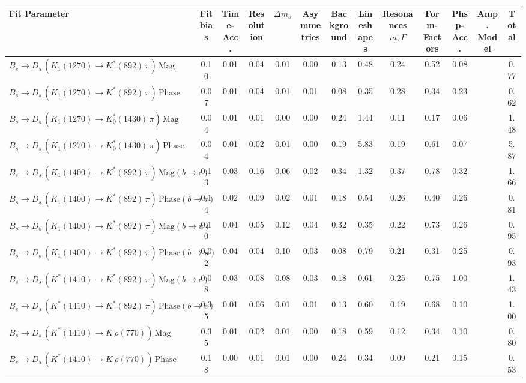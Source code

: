 \begin{tabular}{l  c  c  c  c  c  c  c  c  c  c  c  | c }
\hline
\hline
Fit Parameter & Fit bias & Time-Acc. & Resolution & $\Delta m_{s}$ & Asymmetries & Background & Lineshapes & Resonances $m,\Gamma$ & Form-Factors & Phsp-Acc. & Amp. Model &  Total  \\ 
\hline
$B_s \to D_s \, ( K_1(1270) \to K^{*}(892) \, \pi ) \, \text{Mag}$ & 0.10 & 0.01 & 0.04 & 0.01 & 0.00 & 0.13 & 0.48 & 0.24 & 0.52 & 0.08 &  & 0.77 \\ 
$B_s \to D_s \, ( K_1(1270) \to K^{*}(892) \, \pi ) \, \text{Phase}$ & 0.07 & 0.01 & 0.04 & 0.01 & 0.01 & 0.08 & 0.35 & 0.28 & 0.34 & 0.23 &  & 0.62 \\ 
$B_s \to D_s \, ( K_1(1270) \to K^{*}_{0}(1430) \, \pi ) \, \text{Mag} $ & 0.04 & 0.01 & 0.01 & 0.00 & 0.00 & 0.24 & 1.44 & 0.11 & 0.17 & 0.06 &  & 1.48 \\ 
$B_s \to D_s \, ( K_1(1270) \to K^{*}_{0}(1430) \, \pi ) \, \text{Phase} $ & 0.04 & 0.01 & 0.02 & 0.01 & 0.00 & 0.19 & 5.83 & 0.19 & 0.61 & 0.07 &  & 5.87 \\ 
$B_s \to D_s \, ( K_1(1400) \to K^{*}(892) \, \pi ) \, \text{Mag} (b \to c)$ & 0.13 & 0.03 & 0.16 & 0.06 & 0.02 & 0.34 & 1.32 & 0.37 & 0.78 & 0.32 &  & 1.66 \\ 
$B_s \to D_s \, ( K_1(1400) \to K^{*}(892) \, \pi ) \, \text{Phase} (b \to c)$ & 0.14 & 0.02 & 0.09 & 0.02 & 0.01 & 0.18 & 0.54 & 0.26 & 0.40 & 0.26 &  & 0.81 \\ 
$B_s \to D_s \, ( K_1(1400) \to K^{*}(892) \, \pi ) \, \text{Mag} (b \to u)$ & 0.10 & 0.04 & 0.05 & 0.12 & 0.04 & 0.32 & 0.35 & 0.22 & 0.73 & 0.26 &  & 0.95 \\ 
$B_s \to D_s \, ( K_1(1400) \to K^{*}(892) \, \pi ) \, \text{Phase} (b \to u)$ & 0.02 & 0.04 & 0.04 & 0.10 & 0.03 & 0.08 & 0.79 & 0.21 & 0.31 & 0.25 &  & 0.93 \\ 
$B_s \to D_s \, ( K^{*}(1410) \to K^{*}(892) \, \pi ) \, \text{Mag} (b \to c)$ & 0.08 & 0.03 & 0.08 & 0.08 & 0.03 & 0.18 & 0.61 & 0.25 & 0.75 & 1.00 &  & 1.43 \\ 
$B_s \to D_s \, ( K^{*}(1410) \to K^{*}(892) \, \pi ) \, \text{Phase} (b \to c)$ & 0.35 & 0.01 & 0.06 & 0.01 & 0.01 & 0.13 & 0.60 & 0.19 & 0.68 & 0.10 &  & 1.00 \\ 
$B_s \to D_s \, ( K^{*}(1410) \to K \, \rho(770) ) \, \text{Mag}$ & 0.35 & 0.01 & 0.02 & 0.01 & 0.00 & 0.18 & 0.59 & 0.12 & 0.34 & 0.10 &  & 0.80 \\ 
$B_s \to D_s \, ( K^{*}(1410) \to K \, \rho(770) ) \, \text{Phase}$ & 0.18 & 0.00 & 0.01 & 0.01 & 0.00 & 0.24 & 0.34 & 0.09 & 0.21 & 0.15 &  & 0.53 \\ 

\end{tabular}

